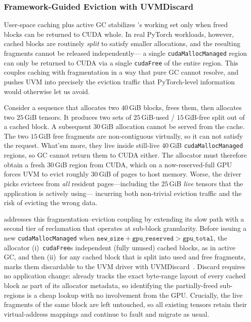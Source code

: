 \subsubsection{Framework-Guided Eviction with UVMDiscard}
\label{uvm:sec:design:discard}

User-space caching plus active GC stabilizes {\uvmname}'s working set
    only when freed blocks can be returned to CUDA whole.
In real PyTorch workloads, however,
    cached blocks are routinely \emph{split} to satisfy smaller allocations,
    and the resulting fragments cannot be released independently---%
    a single \texttt{cudaMallocManaged} region can only be returned to CUDA
    via a single \texttt{cudaFree} of the entire region.
This couples caching with fragmentation in a way
    that pure GC cannot resolve,
    and pushes UVM into precisely the eviction traffic that
    PyTorch-level information would otherwise let us avoid.

Consider a sequence that allocates two $40$\,GiB blocks,
    frees them, then allocates two $25$\,GiB tensors.
It produces two sets of $25$\,GiB-used / $15$\,GiB-free split out of a cached block.
A subsequent $30$\,GiB allocation cannot be served from the cache.
The two $15$\,GiB free fragments are non-contiguous virtually,
    so it can not satisfy the request.
What'sm more, they live inside still-live $40$\,GiB \texttt{cudaMallocManaged} regions,
    so GC cannot return them to CUDA either.
The allocator must therefore obtain a fresh $30$\,GiB region from CUDA,
    which on a now-reserved-full GPU forces UVM
    to evict roughly $30$\,GiB of pages to host memory.
Worse, the driver picks evictees from
    \emph{all} resident pages---including the $25$\,GiB \emph{live} tensors
    that the application is actively using---%
    incurring both non-trivial eviction traffic
    and the risk of evicting the wrong data.

{\uvmname} addresses this fragmentation--eviction coupling
    by extending its slow path with a second tier of reclamation
    that operates at sub-block granularity.
Before issuing a new \texttt{cudaMallocManaged}
    when $\texttt{new\_size} + \texttt{gpu\_reserved} > \texttt{gpu\_total}$,
    the allocator (i)~\texttt{cudaFree}s independent (fully unused) cached blocks,
    as in active GC,
    and then (ii)~for any cached block that is split into used and free fragments,
    marks them discardable to the UVM driver with UVMDiscard~\cite{uvmdiscard}.
Discard requires no application change:
    {\uvmname} already tracks the exact byte-range layout of every cached block
    as part of its allocator metadata,
    so identifying the partially-freed sub-regions is a cheap lookup with no involvement from the GPU.
Crucially, the live fragments of the same block are left untouched,
    so all existing tensors retain their virtual-address mappings
    and continue to fault and migrate as usual.

